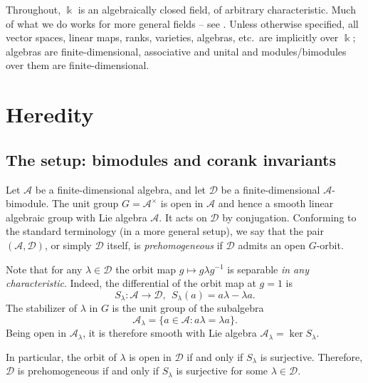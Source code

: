 \documentclass[12pt]{article}
\def\xspace{ }%
\theoremstyle{definition}
\newcommand{\pvs}{prehomogeneous\xspace}
\newcommand{\kk}{\Bbbk}
\newcommand{\alg}{\mathcal{A}}   %
\newcommand{\bmdl}{\mathcal{D}}   %
\newcommand{\Sop}{S}
\begin{document}
Throughout, $\kk$ is an algebraically closed field, of arbitrary characteristic.
Much of what we do works for more general fields -- see .
Unless otherwise specified, all vector spaces, linear maps, ranks, varieties, algebras, etc.~are implicitly over $\kk$;
algebras are finite-dimensional, associative and unital and modules/bimodules over them are finite-dimensional.


\section{Heredity}\label{sec:hered}


\subsection{The setup: bimodules and corank invariants}\label{ssec:pairs}

Let $\alg$ be a finite-dimensional algebra, and let $\bmdl$ be a finite-dimensional $\alg$-bimodule.
The unit group $G=\alg^\times$ is open in $\alg$ and hence a smooth linear algebraic group with Lie algebra $\alg$.
It acts on $\bmdl$ by conjugation.
Conforming to the standard terminology (in a more general setup), we say that the pair $(\alg,\bmdl)$, or simply $\bmdl$ itself, is \emph{\pvs} if $\bmdl$ admits an open $G$-orbit.

Note that for any $\lambda\in\bmdl$ the orbit map $g \mapsto g\lambda g^{-1}$ is separable \emph{in any characteristic}.
Indeed, the differential of the orbit map  at $g = 1$ is
\[
\Sop_\lambda:\alg\longrightarrow\bmdl, \ \ \Sop_\lambda(a)=a\lambda - \lambda a.
\]
The stabilizer of $\lambda$ in $G$ is the unit group of the subalgebra
\[
\alg_\lambda = \{a \in \alg :a\lambda = \lambda a\}.
\]
Being open in $\alg_\lambda$, it is therefore smooth with Lie algebra $\alg_\lambda = \ker \Sop_\lambda$.

In particular, the orbit of $\lambda$ is open in $\bmdl$ if and only if $\Sop_\lambda$ is surjective.
Therefore, $\bmdl$ is \pvs if and only if $\Sop_\lambda$ is surjective for some $\lambda\in\bmdl$.
\end{document}
